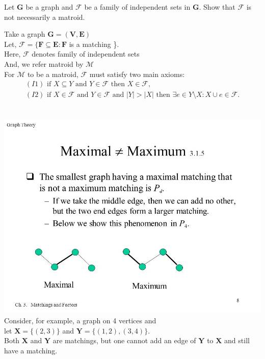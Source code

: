 \documentclass[11pt]{exam}
\begin{document}
\begin{questions}
\begin{solution}
\end{solution}

\question Let $\pmb{G}$ be a graph and $\pmb{\mathcal{F}}$ be a family of independent sets in $\pmb{G}$. Show that $\pmb{\mathcal{F}}$ is not necessarily a matroid.
\begin{solution}
    Take a graph   $\pmb{G = (V, E)}$\\
    Let, $\pmb{\mathcal{F} = \{F \subseteq E : F}$ is a matching \}.\\
    Here, $\pmb{\mathcal{F}} $ denotes family of independent sets\\
    And, we refer matroid by $\pmb{\mathcal{M}}$ \\
    For $\pmb{\mathcal{M}}$ to be a matroid,  $\pmb{\mathcal{F}}$ must satisfy two main axioms: \\
    \begin{align*}
        (I1) \mbox{ if } X \subseteq Y \mbox{ and } Y \in \mathcal{F} \mbox{ then } X \in \mathcal{F}, \\
        (I2) \mbox{ if } X \in \mathcal{F} \mbox{ and } Y \in \mathcal{F} \mbox{ and } |Y | > |X| \mbox{ then } \exists e \in Y \setminus X : X \cup {e} \in \mathcal{F}.
    \end{align*}
    \\\\
    \includegraphics[scale=0.5]{slide_8.jpg}
    \\
    Consider, for example, a graph on 4 vertices and\\
    let $\pmb{X} = \{(2, 3)\}$ and $\pmb{Y} = \{(1, 2),(3, 4)\}$.\\
    Both $\pmb{X}$ and $\pmb{Y}$ are matchings, 
    but one cannot add an edge of $\pmb{Y}$ to $\pmb{X}$ and still have a matching.\\
    

\end{solution}
\end{questions}
\end{document}
